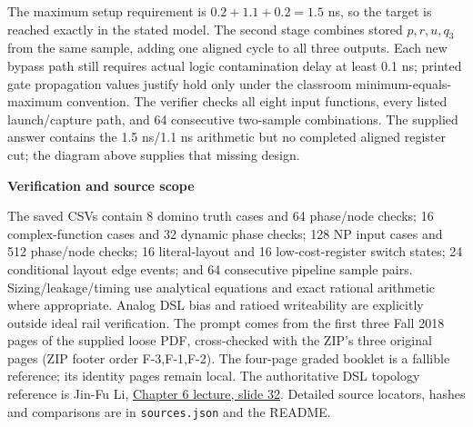 \documentclass[10pt]{article}
\newcommand{\qheading}[1]{\par\medskip\textbf{#1}\par}
\begin{document}
The maximum setup requirement is $0.2+1.1+0.2=1.5$ ns, so the target is reached exactly in the stated model. The second stage combines stored $p,r,u,q_3$ from the same sample, adding one aligned cycle to all three outputs. Each new bypass path still requires actual logic contamination delay at least 0.1 ns; printed gate propagation values justify hold only under the classroom minimum-equals-maximum convention.
The verifier checks all eight input functions, every listed launch/capture path, and 64 consecutive two-sample combinations. The supplied answer contains the 1.5 ns/1.1 ns arithmetic but no completed aligned register cut; the diagram above supplies that missing design.
\qheading{Verification and source scope}
The saved CSVs contain 8 domino truth cases and 64 phase/node checks; 16 complex-function cases and 32 dynamic phase checks; 128 NP input cases and 512 phase/node checks; 16 literal-layout and 16 low-cost-register switch states; 24 conditional layout edge events; and 64 consecutive pipeline sample pairs. Sizing/leakage/timing use analytical equations and exact rational arithmetic where appropriate. Analog DSL bias and ratioed writeability are explicitly outside ideal rail verification.
The prompt comes from the first three Fall 2018 pages of the supplied loose PDF, cross-checked with the ZIP's three original pages (ZIP footer order F-3,F-1,F-2). The four-page graded booklet is a fallible reference; its identity pages remain local. The authoritative DSL topology reference is Jin-Fu Li, \href{https://www.ee.ncu.edu.tw/jfli/public_html/VLSI/lecture/ch06.pdf}{Chapter 6 lecture, slide 32}. Detailed source locators, hashes and comparisons are in \texttt{sources.json} and the README.
\end{document}
